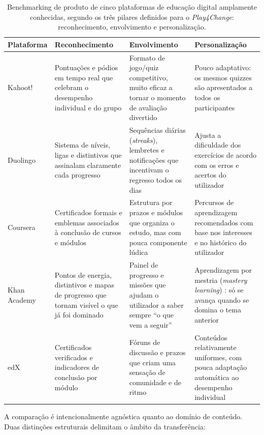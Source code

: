 \begin{table}[htbp]
	\centering
	\small
	\begin{tabular}{p{2.0cm} p{3.55cm} p{3.55cm} p{4.1cm}}
		\toprule
		\textbf{Plataforma} & \textbf{Reconhecimento} & \textbf{Envolvimento} & \textbf{Personalização} \\
		\midrule
		Kahoot! &
			Pontuações e pódios em tempo real que celebram o desempenho individual e do grupo &
			Formato de jogo/quiz competitivo, muito eficaz a tornar o momento de avaliação divertido &
			Pouco adaptativo: os mesmos quizzes são apresentados a todos os participantes \\
		\addlinespace
		Duolingo &
			Sistema de níveis, ligas e distintivos que assinalam claramente cada progresso &
			Sequências diárias (\emph{streaks}), lembretes e notificações que incentivam o regresso todos os dias &
			Ajusta a dificuldade dos exercícios de acordo com os erros e acertos do utilizador \\
		\addlinespace
		Coursera &
			Certificados formais e emblemas associados à conclusão de cursos e módulos &
			Estrutura por prazos e módulos que organiza o estudo, mas com pouca componente lúdica &
			Percursos de aprendizagem recomendados com base nos interesses e no histórico do utilizador \\
		\addlinespace
		Khan Academy &
			Pontos de energia, distintivos e mapas de progresso que tornam visível o que já foi dominado &
			Painel de progresso e missões que ajudam o utilizador a saber sempre ``o que vem a seguir'' &
			Aprendizagem por mestria (\emph{mastery learn\-ing}) \cite{bloom1968learning}: só se avança quando se domina o tema anterior \\
		\addlinespace
		edX &
			Certificados verificados e indicadores de conclusão por módulo &
			Fóruns de discussão e prazos que criam uma sensação de comunidade e de ritmo &
			Conteúdos relativamente uniformes, com pouca adaptação automática ao desempenho individual \\
		\bottomrule
	\end{tabular}
	\caption[Análise comparativa de plataformas de educação digital segundo os três pilares do Play4Change]{Benchmarking de produto de cinco plataformas de educação digital amplamente conhecidas, segundo os três pilares definidos para o \emph{Play4Change}: reconhecimento, envolvimento e personalização.}
	\label{tab:comparacao-plataformas}
\end{table}

A comparação é intencionalmente agnóstica quanto ao domínio de conteúdo. Duas distinções estruturais delimitam o âmbito da transferência:

